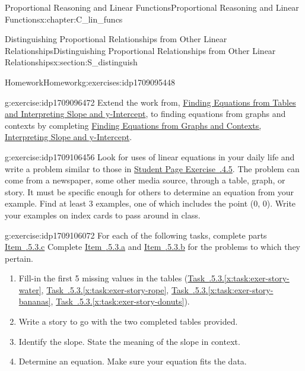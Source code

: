 \documentclass[oneside,10pt,]{book}
\newcommand{\xreffont}{\relax}
\numberwithin{equation}{chapter}
\begin{document}
\begin{chapterptx}{Proportional Reasoning and Linear Functions}{}{Proportional Reasoning and Linear Functions}{}{}{x:chapter:C_lin_funcs}
\begin{sectionptx}{Distinguishing Proportional Relationships from Other Linear Relationships}{}{Distinguishing Proportional Relationships from Other Linear Relationships}{}{}{x:section:S_distinguish}
\begin{exercises-subsection}{Homework}{}{Homework}{}{}{g:exercises:idp1709095448}
\begin{divisionexercise}{1}{}{}{g:exercise:idp1709096472}%
Extend the work from, \hyperref[x:worksheet:act-slope-int]{Finding Equations from Tables and Interpreting Slope and y-Intercept}, to finding equations from graphs and contexts by completing \hyperref[x:worksheet:act-find-eqs]{Finding Equations from Graphs and Contexts, Interpreting Slope and y-Intercept}.%
\end{divisionexercise}%
\begin{divisionexercise}{2}{}{}{g:exercise:idp1709106456}%
Look for uses of linear equations in your daily life and write a problem similar to those in \hyperlink{x:exercise:exer-slope-contexts}{Student Page Exercise~{\xreffont 2.6.4.5}}. The problem can come from a newspaper, some other media source, through a table, graph, or story. It must be specific enough for others to determine an equation from your example. Find at least 3 examples, one of which includes the point (0, 0). Write your examples on index cards to pass around in class.%
\end{divisionexercise}%
\begin{divisionexercise}{3}{}{}{g:exercise:idp1709106072}%
For each of the following tasks, complete parts \hyperlink{x:li:slope-story-c}{Item~{\xreffont 2.6.5.3.c}\textendash{}{\xreffont 2.6.5.3.f}} Complete \hyperlink{x:li:slope-story-a}{Item~{\xreffont 2.6.5.3.a}} and \hyperlink{x:li:slope-story-b}{Item~{\xreffont 2.6.5.3.b}} for the problems to which they pertain.%
\begin{enumerate}[label=(\alph*)]
\item\hypertarget{x:li:slope-story-a}{}Fill-in the first 5 missing values in the tables (\hyperref[x:task:exer-story-water]{Task~{\xreffont 2.6.5.3}.{\xreffont\ref{x:task:exer-story-water}}}, \hyperref[x:task:exer-story-rope]{Task~{\xreffont 2.6.5.3}.{\xreffont\ref{x:task:exer-story-rope}}}, \hyperref[x:task:exer-story-bananas]{Task~{\xreffont 2.6.5.3}.{\xreffont\ref{x:task:exer-story-bananas}}}, \hyperref[x:task:exer-story-donuts]{Task~{\xreffont 2.6.5.3}.{\xreffont\ref{x:task:exer-story-donuts}}}).%
\item\hypertarget{x:li:slope-story-b}{}Write a story to go with the two completed tables provided.%
\item\hypertarget{x:li:slope-story-c}{}Identify the slope. State the meaning of the slope in context.%
\item\hypertarget{x:li:slope-story-d}{}Determine an equation. Make sure your equation fits the data.%

\end{enumerate}
\end{divisionexercise}
\end{exercises-subsection}
\end{sectionptx}
\end{chapterptx}
\end{document}
